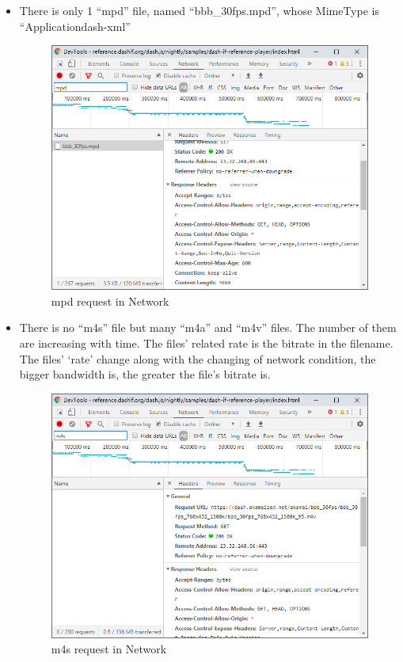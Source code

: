 \documentclass[12pt,letterpaper]{ctexart}
\begin{document}
\begin{itemize}
  \item There is only 1 ``mpd'' file, named ``bbb\_30fps.mpd'', whose MimeType is ``Application\/dash-xml''
  \begin{figure}[H]
    \centering
    \includegraphics[width=0.7\linewidth,natwidth=610,natheight=550]{assets/6.1_mpd.png}
    \caption{mpd request in Network}
    \label{fig:mpd}
  \end{figure}

  \item There is no ``m4s'' file but many ``m4a'' and ``m4v'' files. The number of them are increasing with time.
  The files' related rate is the bitrate in the filename. The files’ `rate' change along with the changing of network condition, the bigger bandwidth is, the greater the file's bitrate is.

  \begin{figure}[H]
    \centering
    \includegraphics[width=0.7\linewidth,natwidth=610,natheight=642]{assets/6.1_m4s.png}
    \caption{m4s request in Network}
    \label{fig:m4s}
  \end{figure}


\end{itemize}
\end{document}

